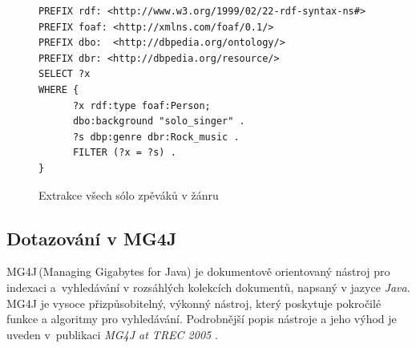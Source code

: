 \begin{figure}[ht]
\begin{lstlisting}[captionpos=b, label=lst:sparql2, basicstyle=\ttfamily,frame=single]
PREFIX rdf: <http://www.w3.org/1999/02/22-rdf-syntax-ns#>
PREFIX foaf: <http://xmlns.com/foaf/0.1/> 
PREFIX dbo:  <http://dbpedia.org/ontology/>
PREFIX dbr: <http://dbpedia.org/resource/>
SELECT ?x
WHERE {
      ?x rdf:type foaf:Person;
      dbo:background "solo_singer" .
      ?s dbp:genre dbr:Rock_music .
      FILTER (?x = ?s) .
} 
\end{lstlisting}
    \caption{Extrakce všech sólo zpěváků v žánru }
    \label{sparql2}
\end{figure}




\subsection{Dotazování v MG4J}
\label{mg4jQuerying}
MG4J\,(Managing Gigabytes for Java) je dokumentově orientovaný nástroj pro indexaci a~vyhledávání v rozsáhlých kolekcích dokumentů, napsaný v jazyce \emph{Java}. MG4J je vysoce přizpůsobitelný, výkonný nástroj, který poskytuje pokročilé funkce a algoritmy pro vyhledávání. Podrobnější popis nástroje a jeho výhod je uveden v~publikaci \emph{MG4J at TREC 2005} \cite{BoVTREC2005}. 


